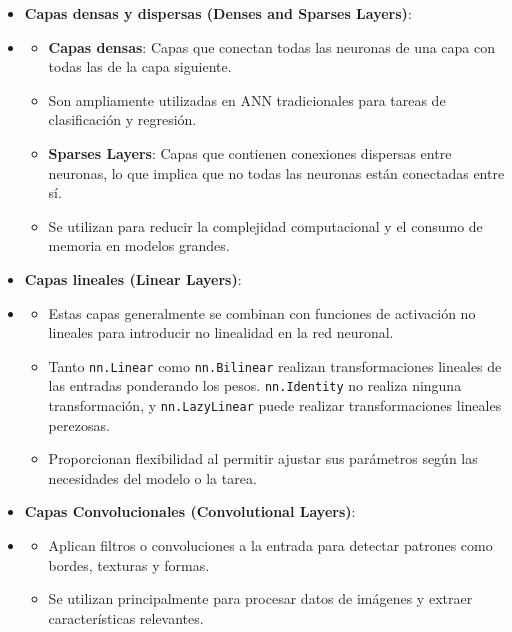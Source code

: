 \begin{itemize}
    \item \textbf{Capas densas y dispersas (Denses and Sparses Layers)}:
    \item[]
          \begin{itemize}
              \item \textbf{Capas densas}: Capas que conectan todas las neuronas de una capa con todas las de la capa siguiente.
              \item[] Son ampliamente utilizadas en \gls{ANN} tradicionales  para tareas de clasificación y regresión.
              \item \textbf{Sparses Layers}: Capas que contienen conexiones dispersas entre neuronas, lo que implica que no todas las neuronas están conectadas entre sí.
              \item[] Se utilizan para reducir la complejidad computacional y el consumo de memoria en modelos grandes.
          \end{itemize}
    \item \textbf{Capas lineales (Linear Layers)}:
    \item[]
          \begin{itemize}
              \item Estas capas generalmente se combinan con funciones de activación no lineales para introducir no linealidad en la red neuronal.
              \item Tanto \texttt{nn.Linear} como \texttt{nn.Bilinear} realizan transformaciones lineales de las entradas ponderando los pesos. \texttt{nn.Identity} no realiza ninguna transformación, y \texttt{nn.LazyLinear} puede realizar transformaciones lineales perezosas.
              \item Proporcionan flexibilidad al permitir ajustar sus parámetros según las necesidades del modelo o la tarea.
          \end{itemize}
    \item \textbf{Capas Convolucionales (Convolutional Layers)}: %
    \item[]
          \begin{itemize}
              \item Aplican filtros o convoluciones a la entrada para detectar patrones como bordes, texturas y formas.
              \item Se utilizan principalmente para procesar datos de imágenes y extraer características relevantes.

\end{itemize}
\end{itemize}
